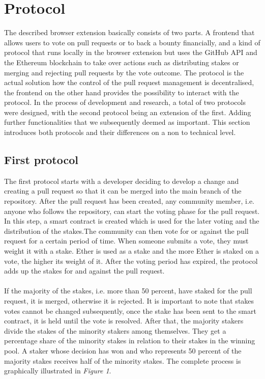 \documentclass[sigconf]{acmart}
\begin{document}
\section{Protocol}
The described browser extension basically consists of two parts. A frontend that allows users to vote on pull requests or to back 
a bounty financially, and a kind of protocol that runs locally in the browser extension but uses the GitHub API and the Ethereum 
blockchain to take over actions such as distributing stakes or merging and rejecting pull requests by the vote outcome.
The protocol is the actual solution how the control of the pull request management is decentralised, the frontend on the 
other hand provides the possibility to interact with the protocol. In the process of development and research, a total of two 
protocols were designed, with the second protocol being an extension of the first. Adding further functionalities that we 
subsequently deemed as important. This section introduces both protocols and their differences on a non to technical level.

\subsection{First protocol}
The first protocol starts with a developer deciding to develop a change and creating a pull request so that it can be merged into the 
main branch of the repository. After the pull request has been created, any community member, i.e. anyone who follows the repository, 
can start the voting phase for the pull request. In this step, a smart contract is created which is used for the later voting and the distribution
 of the stakes.The community can then vote for or against the pull request for a certain period of time.
When someone submits a vote, they must weight it with a stake. Ether is used as a stake and the more Ether is staked on a vote, 
the higher its weight of it. After the voting period has expired, the protocol adds up the stakes for and against the pull request. \\ \\
If the majority of the stakes, i.e. more than 50 percent, have staked for the pull request, it is merged, otherwise it is rejected.
It is important to note that stakes votes cannot be changed subsequently, once the stake has been sent to the smart contract, 
it is held until the vote is resolved.  After that, the majority stakers divide the stakes of the minority stakers among themselves. 
They get a percentage share of the minority stakes in relation to their stakes in the winning pool. A staker whose decision has won
 and who represents 50 percent of the majority stakes receives half of the minority stakes. The complete process is graphically 
illustrated in \textit{Figure 1}.
\end{document}
